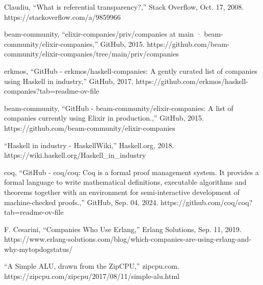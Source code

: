 \documentclass[12pt]{report} %
\begin{document}
\begin{singlespace}
\begin{thebibliography}{}
             Claudiu, “What is referential transparency?,” Stack Overflow, Oct. 17, 2008. https://stackoverflow.com/a/9859966

             beam-community, “elixir-companies/priv/companies at main · beam-community/elixir-companies,” GitHub, 2015. https://github.com/beam-community/elixir-companies/tree/main/priv/companies

             erkmos, “GitHub - erkmos/haskell-companies: A gently curated list of companies using Haskell in industry,” GitHub, 2017. https://github.com/erkmos/haskell-companies?tab=readme-ov-file

             beam-community, “GitHub - beam-community/elixir-companies: A list of companies currently using Elixir in production.,” GitHub, 2015. https://github.com/beam-community/elixir-companies

             “Haskell in industry - HaskellWiki,” Haskell.org, 2018. https://wiki.haskell.org/Haskell\_in\_industry

             coq, “GitHub - coq/coq: Coq is a formal proof management system. It provides a formal language to write mathematical definitions, executable algorithms and theorems together with an environment for semi-interactive development of machine-checked proofs.,” GitHub, Sep. 04, 2024. https://github.com/coq/coq?tab=readme-ov-file

             F. Cesarini, “Companies Who Use Erlang,” Erlang Solutions, Sep. 11, 2019. https://www.erlang-solutions.com/blog/which-companies-are-using-erlang-and-why-mytopdogstatus/

             “A Simple ALU, drawn from the ZipCPU,” zipcpu.com. https://zipcpu.com/zipcpu/2017/08/11/simple-alu.html 

        \end{thebibliography}

    \end{singlespace}

    \appendix
        
    
    
    
\end{document}
